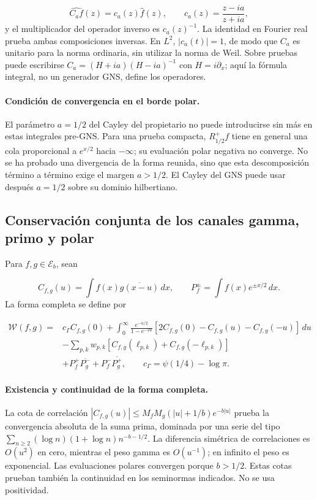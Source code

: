 \[
\widehat{C_af}(z)=c_a(z)\widehat f(z),\qquad
c_a(z)=\frac{z-ia}{z+ia},
\]
y el multiplicador del operador inverso es \(c_a(z)^{-1}\). La identidad en Fourier real prueba ambas composiciones inversas. En \(L^2\), \(|c_a(t)|=1\), de modo que \(C_a\) es unitario para la norma ordinaria, sin utilizar la norma de Weil. Sobre pruebas puede escribirse \(C_a=(H+ia)(H-ia)^{-1}\) con \(H=i\partial_x\); aquí la fórmula integral, no un generador GNS, define los operadores.

\paragraph{Condición de convergencia en el borde polar.} El parámetro \(a=1/2\) del Cayley del propietario no puede introducirse sin más en estas integrales pre-GNS. Para una prueba compacta, \(R_{1/2}^+f\) tiene en general una cola proporcional a \(e^{x/2}\) hacia \(-\infty\); su evaluación polar negativa no converge. No se ha probado una divergencia de la forma reunida, sino que esta descomposición término a término exige el margen \(a>1/2\). El Cayley del GNS puede usar después \(a=1/2\) sobre su dominio hilbertiano.


\subsection{Conservación conjunta de los canales gamma, primo y polar}
\label{tm-add-m5}
Para \(f,g\in\mathscr E_b\), sean

\[
C_{f,g}(u)=\int f(x)\overline{g(x-u)}\,dx,
\qquad P_f^\pm=\int f(x)e^{\pm x/2}\,dx.
\]
La forma completa se define por

\[
\begin{aligned}
\mathscr W(f,g)={}&c_\Gamma C_{f,g}(0)
+\int_0^\infty\frac{e^{-u/2}}{1-e^{-2u}}
 [2C_{f,g}(0)-C_{f,g}(u)-C_{f,g}(-u)]\,du\\
&-\sum_{p,k}w_{p,k}
 [C_{f,g}(\ell_{p,k})+C_{f,g}(-\ell_{p,k})]\\
&+P_f^+\overline{P_g^-}+P_f^-\overline{P_g^+},
\qquad c_\Gamma=\psi(1/4)-\log\pi.
\end{aligned}
\]
\paragraph{Existencia y continuidad de la forma completa.} La cota de correlación \(|C_{f,g}(u)|\le M_fM_g(|u|+1/b)e^{-b|u|}\) prueba la convergencia absoluta de la suma prima, dominada por una serie del tipo \(\sum_{n\ge2}(\log n)(1+\log n)n^{-b-1/2}\). La diferencia simétrica de correlaciones es \(O(u^2)\) en cero, mientras el peso gamma es \(O(u^{-1})\); en infinito el peso es exponencial. Las evaluaciones polares convergen porque \(b>1/2\). Estas cotas prueban también la continuidad en los seminormas indicados. No se usa positividad.

